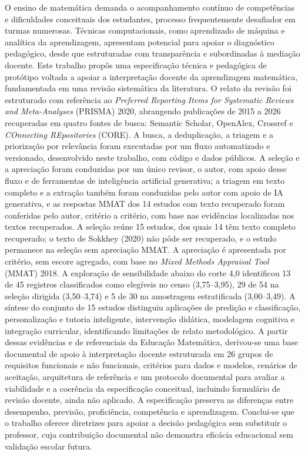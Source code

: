 \begin{resumo}
\noindent

O ensino de matemática demanda o acompanhamento contínuo de competências e dificuldades conceituais dos estudantes, processo frequentemente desafiador em turmas numerosas. Técnicas computacionais, como aprendizado de máquina e analítica da aprendizagem, apresentam potencial para apoiar o diagnóstico pedagógico, desde que estruturadas com transparência e subordinadas à mediação docente. Este trabalho propôs uma especificação técnica e pedagógica de protótipo voltada a apoiar a interpretação docente da aprendizagem matemática, fundamentada em uma revisão sistemática da literatura. O relato da revisão foi estruturado com referência ao \textit{Preferred Reporting Items for Systematic Reviews and Meta-Analyses} (PRISMA) 2020, abrangendo publicações de 2015 a 2026 recuperadas em quatro fontes de busca: Semantic Scholar, OpenAlex, Crossref e \textit{COnnecting REpositories} (CORE). A busca, a deduplicação, a triagem e a priorização por relevância foram executadas por um fluxo automatizado e versionado, desenvolvido neste trabalho, com código e dados públicos. A seleção e a apreciação foram conduzidas por um único revisor, o autor, com apoio desse fluxo e de ferramentas de inteligência artificial generativa; a triagem em texto completo e a extração também foram conduzidas pelo autor com apoio de IA generativa, e as respostas MMAT dos 14 estudos com texto recuperado foram conferidas pelo autor, critério a critério, com base nas evidências localizadas nos textos recuperados. A seleção reúne 15 estudos, dos quais 14 têm texto completo recuperado; o texto de Sokkhey (2020) não pôde ser recuperado, e o estudo permanece na seleção sem apreciação MMAT. A apreciação é apresentada por critério, sem escore agregado, com base no \textit{Mixed Methods Appraisal Tool} (MMAT) 2018. A exploração de sensibilidade abaixo do corte 4,0 identificou 13 de 45 registros classificados como elegíveis no censo (3,75--3,95), 29 de 54 na seleção dirigida (3,50--3,74) e 5 de 30 na amostragem estratificada (3,00--3,49). A síntese do conjunto de 15 estudos distinguiu aplicações de predição e classificação, personalização e tutoria inteligente, intervenção didática, modelagem cognitiva e integração curricular, identificando limitações de relato metodológico. A partir dessas evidências e de referenciais da Educação Matemática, derivou-se uma base documental de apoio à interpretação docente estruturada em 26 grupos de requisitos funcionais e não funcionais, critérios para dados e modelos, cenários de aceitação, arquitetura de referência e um protocolo documental para avaliar a viabilidade e a coerência da especificação conceitual, incluindo formulário de revisão docente, ainda não aplicado. A especificação preserva as diferenças entre desempenho, previsão, proficiência, competência e aprendizagem. Conclui-se que o trabalho oferece diretrizes para apoiar a decisão pedagógica sem substituir o professor, cuja contribuição documental não demonstra eficácia educacional sem validação escolar futura.


\end{resumo}
